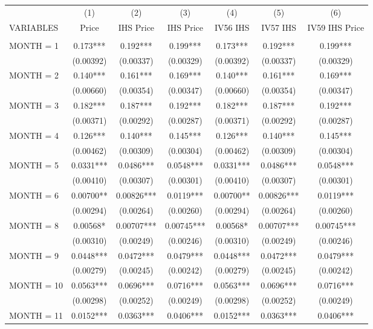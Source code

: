 \begin{tabular}{lcccccc} \hline
 & (1) & (2) & (3) & (4) & (5) & (6) \\
VARIABLES & Price & IHS Price & IHS Price & IV56 IHS & IV57 IHS & IV59 IHS Price \\ \hline
 &  &  &  &  &  &  \\
MONTH = 1 & 0.173*** & 0.192*** & 0.199*** & 0.173*** & 0.192*** & 0.199*** \\
 & (0.00392) & (0.00337) & (0.00329) & (0.00392) & (0.00337) & (0.00329) \\
MONTH = 2 & 0.140*** & 0.161*** & 0.169*** & 0.140*** & 0.161*** & 0.169*** \\
 & (0.00660) & (0.00354) & (0.00347) & (0.00660) & (0.00354) & (0.00347) \\
MONTH = 3 & 0.182*** & 0.187*** & 0.192*** & 0.182*** & 0.187*** & 0.192*** \\
 & (0.00371) & (0.00292) & (0.00287) & (0.00371) & (0.00292) & (0.00287) \\
MONTH = 4 & 0.126*** & 0.140*** & 0.145*** & 0.126*** & 0.140*** & 0.145*** \\
 & (0.00462) & (0.00309) & (0.00304) & (0.00462) & (0.00309) & (0.00304) \\
MONTH = 5 & 0.0331*** & 0.0486*** & 0.0548*** & 0.0331*** & 0.0486*** & 0.0548*** \\
 & (0.00410) & (0.00307) & (0.00301) & (0.00410) & (0.00307) & (0.00301) \\
MONTH = 6 & 0.00700** & 0.00826*** & 0.0119*** & 0.00700** & 0.00826*** & 0.0119*** \\
 & (0.00294) & (0.00264) & (0.00260) & (0.00294) & (0.00264) & (0.00260) \\
MONTH = 8 & 0.00568* & 0.00707*** & 0.00745*** & 0.00568* & 0.00707*** & 0.00745*** \\
 & (0.00310) & (0.00249) & (0.00246) & (0.00310) & (0.00249) & (0.00246) \\
MONTH = 9 & 0.0448*** & 0.0472*** & 0.0479*** & 0.0448*** & 0.0472*** & 0.0479*** \\
 & (0.00279) & (0.00245) & (0.00242) & (0.00279) & (0.00245) & (0.00242) \\
MONTH = 10 & 0.0563*** & 0.0696*** & 0.0716*** & 0.0563*** & 0.0696*** & 0.0716*** \\
 & (0.00298) & (0.00252) & (0.00249) & (0.00298) & (0.00252) & (0.00249) \\
MONTH = 11 & 0.0152*** & 0.0363*** & 0.0406*** & 0.0152*** & 0.0363*** & 0.0406*** \\

\end{tabular}
